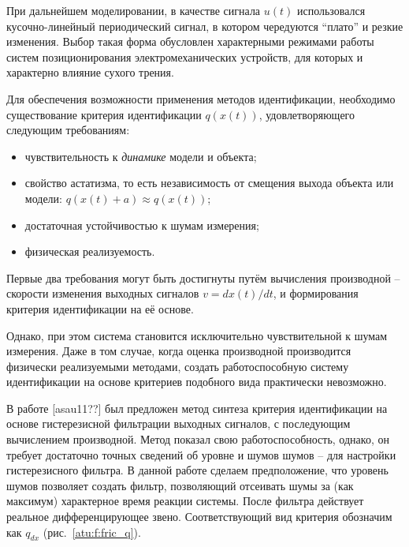 \documentclass[a4paper,12pt]{article}
\begin{document}
При дальнейшем моделировании, в качестве сигнала $u(t)$ использовался кусочно-линейный периодический сигнал,
в котором чередуются ``плато'' и резкие изменения. Выбор такая форма обусловлен
характерными режимами работы систем позиционирования электромеханических
устройств, для которых и характерно влияние сухого трения.

Для обеспечения возможности применения методов идентификации,
необходимо существование критерия идентификации
\( q(x(t)) \),
удовлетворяющего следующим требованиям:

\begin{itemize}

\item
чувствительность к \textit{динамике} модели и объекта;

\item
свойство астатизма, то есть
независимость
от смещения выхода объекта или модели:
\( q(x(t)+a ) \approx q( x(t) ) \);

\item
достаточная устойчивостью к шумам измерения;

\item
физическая реализуемость.

\end{itemize}

Первые два требования
могут быть достигнуты путём вычисления производной --
скорости изменения выходных сигналов
\(v = dx(t)/dt \),
и формирования критерия идентификации на её основе.

Однако, при этом система становится исключительно чувствительной
к шумам измерения. Даже в том случае, когда
оценка производной производится физически реализуемыми методами,
создать работоспособную систему идентификации на основе критериев
подобного вида практически невозможно.

В работе [asau11??] был предложен метод синтеза критерия идентификации
на основе гистерезисной фильтрации выходных сигналов, с последующим
вычислением производной. Метод показал свою работоспособность, однако,
он требует достаточно точных сведений об уровне и шумов шумов -- для
настройки гистерезисного фильтра. В данной работе сделаем предположение,
что уровень шумов позволяет создать фильтр, позволяющий отсеивать шумы
за (как максимум) характерное время реакции системы.
После фильтра действует реальное дифференцирующее звено.
Соответствующий вид критерия обозначим как $ q_{dx} $ (рис.~\ref{atu:f:fric_q}).
\end{document}
